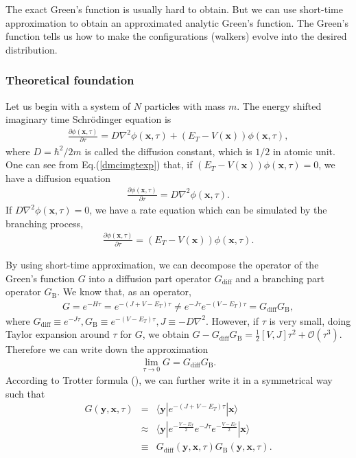 \documentclass[12pt,letterpaper,UTF8]{report}
\begin{document}
{The exact Green's function is usually hard to obtain. But we can use short-time approximation to obtain an approximated analytic Green's function. The Green's function tells us how to make the configurations (walkers) evolve into the desired distribution.

\subsubsection{ Theoretical foundation }
Let us begin with a system of $N$ particles with mass $m$. The energy shifted imaginary time Schr\"{o}dinger equation is
\begin{eqnarray}
\frac{\partial \phi(\bm{x},\tau)}{\partial \tau} = D\nabla^2 \phi(\bm{x},\tau) + (E_T - V(\bm{x})) \phi(\bm{x},\tau), \label{dmcimgtexp}
 \end{eqnarray}
where $D=\hbar^2/{2 m}$ is called the diffusion constant, which is $1/2$ in atomic unit. One can see from Eq.(\ref{dmcimgtexp}) that, if $(E_T - V(\bm{x})) \phi(\bm{x},\tau) = 0$, we have a diffusion equation
\begin{eqnarray}
\frac{\partial \phi(\bm{x},\tau)}{\partial \tau} = D\nabla^2 \phi(\bm{x},\tau). \label{dmcimgtdiff}
 \end{eqnarray}
If $D\nabla^2 \phi(\bm{x},\tau) = 0$, we have a rate equation which can be simulated by the branching process,
\begin{eqnarray}
\frac{\partial \phi(\bm{x},\tau)}{\partial \tau} = (E_T - V(\bm{x})) \phi(\bm{x},\tau). \label{dmcimgtbran}
 \end{eqnarray}

By using short-time approximation, we can decompose the operator of the Green's function $G$ into a diffusion part operator $G_{\textrm{diff}}$ and a branching part operator $G_{\textrm{B}}$. We know that, as an operator,
\begin{eqnarray}
G = e^{-H\tau} = e^{-(J+V-E_T)\tau} \neq e^{-J\tau} e^{-(V-E_T)\tau} = G_{\textrm{diff}} G_{\textrm{B}},
 \end{eqnarray}
where $G_{\textrm{diff}} \equiv  e^{-J\tau}, G_{\textrm{B}} \equiv  e^{-(V-E_T)\tau}, J \equiv - D \nabla ^2$.
However, if $\tau$ is very small, doing Taylor expansion around $\tau$ for $G$, we obtain $G - G_{\textrm{diff}} G_{\textrm{B}} = \frac{1}{2} [V,J] \tau^2 + \mathcal{O}(\tau^3)$. Therefore we can write down the approximation
\begin{eqnarray}
 \lim_{\tau \rightarrow 0}G = G_{\textrm{diff}} G_{\textrm{B}} .
\end{eqnarray}
According to Trotter formula (\cite{Kalosbook2008}), we can further write it in a symmetrical way such that
\begin{eqnarray}
G(\bm{y},\bm{x},\tau) &=& \langle \bm{y} |e^{-(J+V-E_T)\tau} | \bm{x} \rangle \nonumber \\
& \approx & \langle \bm{y} | e^{-\frac{V-E_T}{2}} e^{-J \tau} e^{-\frac{V-E_T}{2}} | \bm{x} \rangle \nonumber \\
& \equiv & G_{\textrm{diff}}(\bm{y},\bm{x},\tau) G_{\textrm{B}}(\bm{y},\bm{x},\tau). \label{eq204}
 \end{eqnarray}

}
\end{document}

